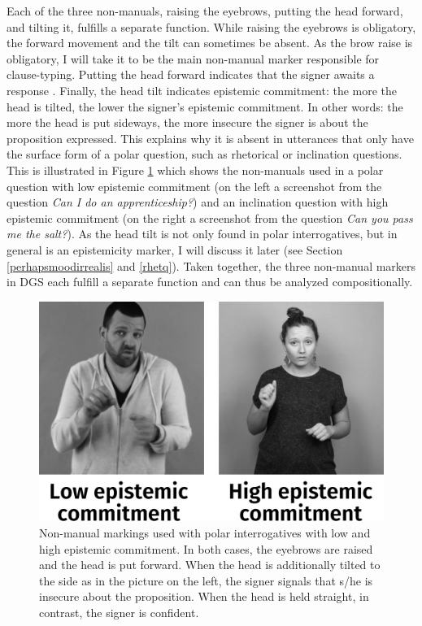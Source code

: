 Each of the three non-manuals, raising the eyebrows, putting the head forward, and tilting it, fulfills a separate function. While raising the eyebrows is obligatory, the forward movement and the tilt can sometimes be absent. As the brow raise is obligatory, I will take it to be the main non-manual marker responsible for clause-typing. Putting the head forward indicates that the signer awaits a response \citep[171--172]{papaspyrou2008grammatik}. Finally, the head tilt indicates epistemic commitment: the more the head is tilted, the lower the signer's epistemic commitment. In other words: the more the head is put sideways, the more insecure the signer is about the proposition expressed. This explains why it is absent in utterances that only have the surface form of a polar question, such as rhetorical or inclination questions. This is illustrated in Figure \ref{fig:epistemiccommitment} which shows the non-manuals used in a polar question with low epistemic commitment (on the left a screenshot from the question \textit{Can I do an apprenticeship?}) and an inclination question with high epistemic commitment (on the right a screenshot from the question \textit{Can you pass me the salt?}). As the head tilt is not only found in polar interrogatives, but in general is an epistemicity marker, I will discuss it later (see Section \ref{perhapsmoodirrealis} and \ref{rhetq}). Taken together, the three non-manual markers in DGS each fulfill a separate function and can thus be analyzed compositionally.

\begin{figure}[bt]
\centering
	\includegraphics[width=.7\textwidth]{epistemiccommitmentsw.jpg}
	\caption{Non-manual markings used with polar interrogatives with low and high epistemic commitment. In both cases, the eyebrows are raised and the head is put forward. When the head is additionally tilted to the side as in the picture on the left, the signer signals that s/he is insecure about the proposition. When the head is held straight, in contrast, the signer is confident.}
		\label{fig:epistemiccommitment}
\end{figure}	


